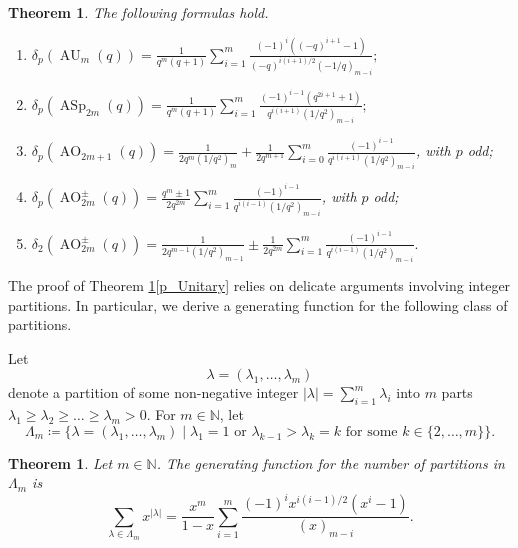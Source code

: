 \documentclass[a4paper, 12pt, oneside]{amsart}
\newtheorem{thm}[prop]{Theorem}
\theoremstyle{definition}
\DeclareMathOperator{\AU}{AU}
\DeclareMathOperator{\ASp}{ASp}
\DeclareMathOperator{\AO}{AO}
\begin{document}
\begin{thm}
\label{p_main}
The following formulas hold.
\begin{enumerate}
\item \label{p_Unitary}
$\displaystyle \delta_p(\AU_m(q))=
\frac{1}{q^m(q+1)}\sum_{i=1}^m\frac{(-1)^i((-q)^{i+1}-1)}{(-q)^{i(i+1)/2}(-1/q)_{m-i}};$
\item \label{p_Symplectic}
$\displaystyle \delta_p(\ASp_{2m}(q))=\frac{1}{q^m(q+1)}\sum_{i=1}^{m}\frac{(-1)^{i-1}(q^{2i+1}+1)}{q^{i(i+1)}(1/q^2)_{m-i}};$
\item \label{p_Orthogonal_2m+1}
$\displaystyle \delta_p(\AO_{2m+1}(q))=\frac{1}{2q^m(1/q^2)_{m}}+\frac{1}{2q^{m+1}}\sum_{i=0}^{m}\frac{(-1)^{i-1}}{q^{i(i+1)}(1/q^2)_{m-i}}$, with $p$ odd;
\item \label{p_Orthogonal_2modd}
$\displaystyle \delta_p(\AO^{\pm}_{2m}(q))=\frac{q^m\pm1}{2q^{2m}}\sum_{i=1}^{m}\frac{(-1)^{i-1}}{q^{i(i-1)}(1/q^2)_{m-i}}$, with $p$ odd;
\item \label{p_Orthogonal_2meven}
$\displaystyle \delta_2(\AO^{\pm}_{2m}(q))=\frac{1}{2q^{m-1}(1/q^2)_{m-1}}\pm \frac{1}{2q^{2m}}\sum_{i=1}^{m}\frac{(-1)^{i-1}}{q^{i(i-1)}(1/q^2)_{m-i}}.$
\end{enumerate}
\end{thm}

The proof of Theorem \ref{p_main}\eqref{p_Unitary} relies on delicate arguments involving integer partitions. 
In particular, we derive a generating function for the following class of partitions.

Let $$\lambda=(\lambda_1,\dots,\lambda_m)$$ denote a partition of some non-negative integer $|\lambda|=\sum_{i=1}^{m}\lambda_i$ into $m$ parts $\lambda_1 \ge \lambda_2 \ge \dots \ge \lambda_m>0$.
For $m \in \mathbb{N}$, let
\begin{equation}
\label{Lambda_m}
\Lambda_m\coloneqq\{\lambda=(\lambda_1,\dots,\lambda_m)\mid \lambda_1=1 \text{ or } \lambda_{k-1}>\lambda_k=k\text{ for some }k \in \{2,\dots,m\} \}.
\end{equation}

\begin{thm}
\label{gen_fun_U}
Let $m \in \mathbb{N}$.
The generating function for the number of partitions in $\Lambda_m$ is 
$$\sum_{\lambda \in \Lambda_m}x^{|\lambda|}
=\frac{x^m}{1-x}\sum_{i=1}^{m}\frac{(-1)^{i}x^{i(i-1)/2}(x^i-1)}{(x)_{m-i}}.
$$
\end{thm}
\end{document}
